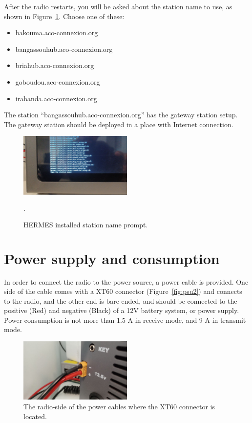 \documentclass[11pt,a4paper]{article}
\begin{document}
After the radio restarts, you will be asked about the station name to use, as shown in Figure~\ref{fig:inst5}. Choose one of these:
\begin{itemize}
\item bakouma.aco-connexion.org
\item bangassouhub.aco-connexion.org
\item briahub.aco-connexion.org
\item goboudou.aco-connexion.org
\item irabanda.aco-connexion.org
\end{itemize}

The station ``bangassouhub.aco-connexion.org'' has the gateway station setup. The gateway station should be deployed
in a place with Internet connection.

\begin{figure}[H]
  \centering
  \includegraphics[width=0.5\textwidth]{pictures/inst-5.jpg}
  \caption{HERMES installed station name prompt.}.
  \label{fig:inst5}
\end{figure}






\section{Power supply and consumption}

In order to connect the radio to the power source, a power cable is provided. One side of the
cable comes with a XT60 connector (Figure~\ref{fig:psu2}) and connects to the radio, and the other end is bare ended,
and should be connected to the positive (Red) and negative (Black) of a 12V battery system, or power
supply. Power consumption is not more than 1.5 A in receive mode, and 9 A in transmit mode.

\begin{figure}[!ht]
  \centering
  \includegraphics[width=0.5\textwidth]{pictures/psu1.jpeg}
  \caption{The radio-side of the power cables where the XT60 connector is located.}
  \label{fig:psu1}
\end{figure}
\end{document}

